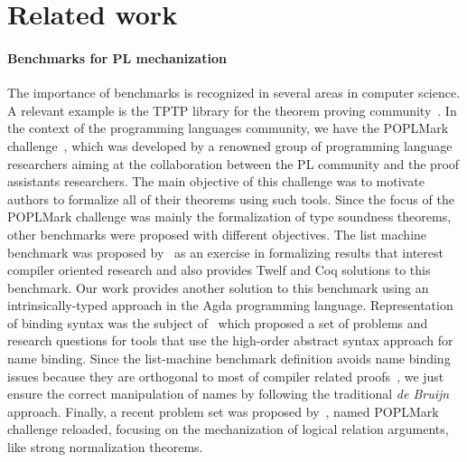 \documentclass[review]{elsarticle}
\theoremstyle{definition}
\begin{document}

\section{Related work}\label{sec:related}

\paragraph{Benchmarks for PL mechanization}{
The importance of benchmarks is recognized in several areas in computer science. A relevant example is the
TPTP library for the theorem proving community~\cite{Sut17}. In the context of the programming languages community,
we have the POPLMark challenge~\cite{Aydemir05}, which was developed by a renowned group of programming language researchers aiming
at the collaboration between the PL community and the proof assistants researchers. The main objective of this challenge
was to motivate authors to formalize all of their theorems using such tools. Since the focus of the POPLMark challenge
was mainly the formalization of type soundness theorems, other benchmarks were proposed with different objectives. The list
machine benchmark was proposed by~\citet{Appel07} as an exercise in formalizing results that interest
compiler oriented research and also provides Twelf and Coq solutions to this benchmark. Our work provides another
solution to this benchmark using an intrinsically-typed approach in the Agda programming language. Representation of binding syntax
was the subject of~\citet{FeltyMP18} which proposed a set of problems and research questions for tools
that use the high-order abstract syntax approach for name binding. Since the list-machine benchmark definition avoids
name binding issues because they are orthogonal to most of compiler related proofs~\cite{Appel07}, we just ensure
the correct manipulation of names by following the traditional \emph{de Bruijn} approach. Finally, a recent problem set
was proposed by~\citet{Pientka18}, named POPLMark challenge reloaded, focusing on the mechanization
of logical relation arguments, like strong normalization theorems.}
\end{document}
